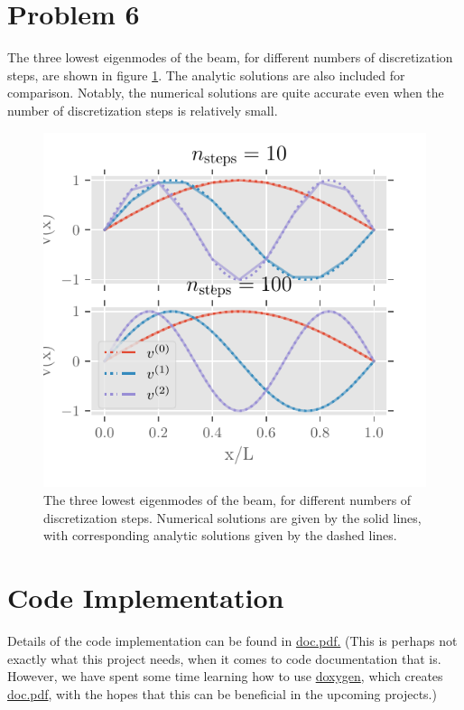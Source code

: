 \documentclass[english,notitlepage,reprint,nofootinbib]{revtex4-2}  %
\begin{document}
\section{Problem 6}
The three lowest eigenmodes of the beam, for different numbers of discretization steps, are shown in figure \ref{fig:eigenvectors}. 
The analytic solutions are also included for comparison.
Notably, the numerical solutions are quite accurate even when the number of discretization steps is relatively small.
\begin{figure}
    \centering
    \includegraphics{Code/output/eigenvectors.pdf}
    \caption{The three lowest eigenmodes of the beam, for different numbers of discretization steps.
    Numerical solutions are given by the solid lines, with corresponding analytic solutions given by the dashed lines.}
    \label{fig:eigenvectors}
\end{figure}

\section{Code Implementation}
Details of the code implementation can be found in \href{https://github.com/isakrukan/FYS4150/blob/main/Project2/docs/doc.pdf}{doc.pdf.} (This is perhaps not exactly what this project needs, when it comes to code documentation that is. However, we have spent some time learning how to use \href{https://www.doxygen.nl/}{doxygen}, which creates \href{https://github.com/isakrukan/FYS4150/blob/main/Project2/docs/doc.pdf}{doc.pdf}, with the hopes that this can be beneficial in the upcoming projects.)



\onecolumngrid
% 


\end{document}
